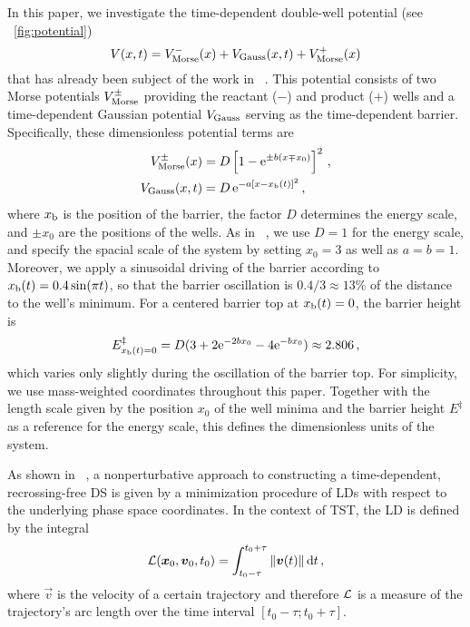 \documentclass[aip,reprint,jcp,amsmath,amssymb,superscriptaddress,floatfix]{revtex4-1}
\begin{document}
In this paper, we investigate the time-dependent double-well potential 
(see \FIG~\ref{fig:potential})
% 
\begin{equation}
  V(x,t) = 
  V_\text{Morse}^-(x) + V_\text{Gauss}(x,t) + V_\text{Morse}^+(x) 
  \label{eq:potential}
\end{equation}
% 
that has already been subject of the work in \REF~.
This potential consists of two Morse potentials $V_\text{Morse}^\pm$ providing 
the reactant ($-$) and product ($+$) wells and a time-dependent Gaussian 
potential $V_\text{Gauss}$ serving as the time-dependent barrier.
% 
Specifically, these dimensionless potential terms are
\begin{subequations}
\begin{align}
V_\text{Morse}^\pm(x) &= D \left[1 - \mathrm{e}^{ \pm b (x \mp x_0)}\right]^2  \,, \\
V_\text{Gauss} (x,t) &= D \, \mathrm{e}^{- a \left[ x - x_{\rm b}(t) \right]^2} \,,
\end{align}%
\label{eq:potential-single-terms}%
\end{subequations}
% 
where $x_\text{b}$ is the position of the barrier, 
the factor $D$ determines the energy scale, 
and $\pm x_0$ are the positions of the wells.
As in \REF~, we use $D=1$ for the energy scale, and 
specify the spacial scale of the system by setting 
$x_0=3$ as well as $a=b=1$.
Moreover, we apply a sinusoidal driving of the barrier 
according to $x_\text{b}(t)= 0.4 \sin( \pi t )$, so that the barrier oscillation is 
$0.4/3\approx13\%$ of the distance to the well's minimum.
For a centered barrier top at $x_\text{b}(t)=0$, the barrier height is
% 
\begin{equation}
E^\ddagger_{x_\text{b}(t)=0} = D (3 + 2 \mathrm{e}^{-2 b x_0} - 4 \mathrm{e}^{-b x_0})
\approx 2.806 \,,
\end{equation}
% 
which varies only slightly during the oscillation of the barrier top.
% 
For simplicity, we use mass-weighted coordinates throughout this paper.
Together with the length scale given by the position $x_0$ of the well minima 
and the barrier height $E^\ddagger$ as a reference for the energy scale, this 
defines the dimensionless units of the system.

As shown in 
\REFS~, 
a nonperturbative approach to constructing a time-dependent, recrossing-free DS 
is given by a minimization procedure of LDs with respect to the underlying phase 
space coordinates.
% 
In the context of TST, the LD is defined by the integral
% 
\begin{equation}
 \mathcal{L} ( \boldsymbol{x}_0, \boldsymbol{v}_0, t_0) = 
 \int_{t_0-\tau}^{t_0+\tau} \| \boldsymbol{v}(t) \| \, \mathrm{d}t \,,
 \label{eq:LD}
\end{equation}
% 
where $\vec v$ is the velocity of a certain trajectory and therefore 
$\mathcal{L}$ is a measure of the trajectory's arc length over the time interval 
$[t_0-\tau;t_0+\tau]$. 
\end{document}
